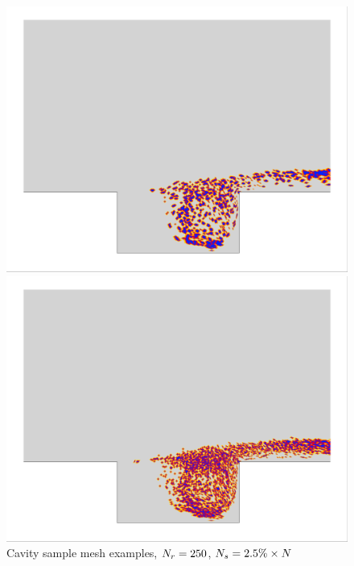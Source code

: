 \begin{figure}
	\begin{minipage}{0.49\linewidth}
		\includegraphics[width=0.99\linewidth,trim={0.5em 0.5em 0.5em 0.5em},clip]{Chapters/CavityAndCVRC/Images/cavity/deim/iBlank_greedy_carlberg_zoom.png}
	\end{minipage}
	\begin{minipage}{0.49\linewidth}
		\includegraphics[width=0.99\linewidth,trim={0.5em 0.5em 0.5em 0.5em},clip]{Chapters/CavityAndCVRC/Images/cavity/deim/iBlank_greedy_ben_zoom.png}
	\end{minipage}
	\caption{\label{fig:cavityiBlank}Cavity sample mesh examples, $N_r= 250$, $N_s = 2.5\% \times N$}
\end{figure}

